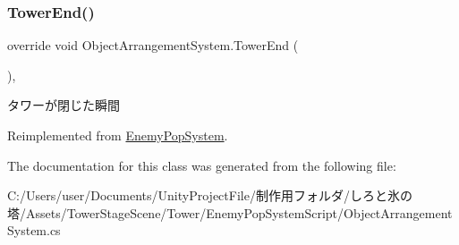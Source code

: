 \subsubsection{\texorpdfstring{Tower\+End()}{TowerEnd()}}
{\footnotesize\ttfamily override void Object\+Arrangement\+System.\+Tower\+End (\begin{DoxyParamCaption}{ }\end{DoxyParamCaption})\hspace{0.3cm}{\ttfamily [inline]}, {\ttfamily [virtual]}}



タワーが閉じた瞬間 



Reimplemented from \hyperlink{class_enemy_pop_system_ad19396ecf796350cedde7a996d4b3843}{Enemy\+Pop\+System}.



The documentation for this class was generated from the following file\+:\begin{DoxyCompactItemize}
\item 
C\+:/\+Users/user/\+Documents/\+Unity\+Project\+File/制作用フォルダ/しろと氷の塔/\+Assets/\+Tower\+Stage\+Scene/\+Tower/\+Enemy\+Pop\+System\+Script/Object\+Arrangement\+System.\+cs\end{DoxyCompactItemize}
